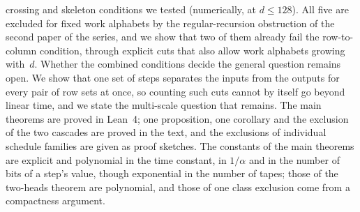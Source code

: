 crossing and skeleton conditions we tested (numerically, at $d\le128$). All five are excluded for fixed work alphabets by the
regular-recursion obstruction of the second paper of the series, and we show that two of them already fail the row-to-column condition,
through explicit cuts that also allow work alphabets growing with~$d$. Whether the combined conditions decide the general question
remains open. We show that one set of steps separates the
inputs from the outputs for every pair of row sets at once, so counting such cuts cannot by itself go beyond linear time, and we state
the multi-scale question that remains. The main theorems are proved in Lean~4; one proposition, one corollary and the exclusion of the two cascades are proved in
the text, and the exclusions of individual schedule families are given as proof sketches. The constants of the main theorems are explicit
and polynomial in the time constant, in $1/\alpha$ and in the number of bits of a step's value, though exponential in the number of
tapes; those of the two-heads theorem are polynomial, and those of one class exclusion come from a compactness argument.

